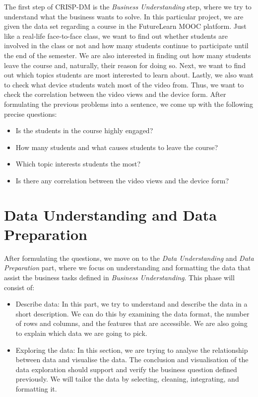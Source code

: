 \documentclass[12pt,]{article}
\providecommand{\tightlist}{%
\setlength{\itemsep}{0pt}\setlength{\parskip}{0pt}}
\begin{document}
The first step of CRISP-DM is the \emph{Business Understanding} step,
where we try to understand what the business wants to solve. In this
particular project, we are given the data set regarding a course in the
FutureLearn MOOC platform. Just like a real-life face-to-face class, we
want to find out whether students are involved in the class or not and
how many students continue to participate until the end of the semester.
We are also interested in finding out how many students leave the course
and, naturally, their reason for doing so. Next, we want to find out
which topics students are most interested to learn about. Lastly, we
also want to check what device students watch most of the video from.
Thus, we want to check the correlation between the video views and the
device form. After formulating the previous problems into a sentence, we
come up with the following precise questions:

\begin{itemize}
\tightlist
\item
  Is the students in the course highly engaged?
\item
  How many students and what causes students to leave the course?
\item
  Which topic interests students the most?
\item
  Is there any correlation between the video views and the device form?
\end{itemize}

\hypertarget{data-understanding-and-data-preparation}{%
\section{Data Understanding and Data
Preparation}\label{data-understanding-and-data-preparation}}

After formulating the questions, we move on to the \emph{Data
Understanding} and \emph{Data Preparation} part, where we focus on
understanding and formatting the data that assist the business tasks
defined in \emph{Business Understanding}. This phase will consist of:

\begin{itemize}
\item
  Describe data: In this part, we try to understand and describe the
  data in a short description. We can do this by examining the data
  format, the number of rows and columns, and the features that are
  accessible. We are also going to explain which data we are going to
  pick.
\item
  Exploring the data: In this section, we are trying to analyse the
  relationship between data and visualise the data. The conclusion and
  visualisation of the data exploration should support and verify the
  business question defined previously. We will tailor the data by
  selecting, cleaning, integrating, and formatting it.
\end{itemize}
\end{document}
